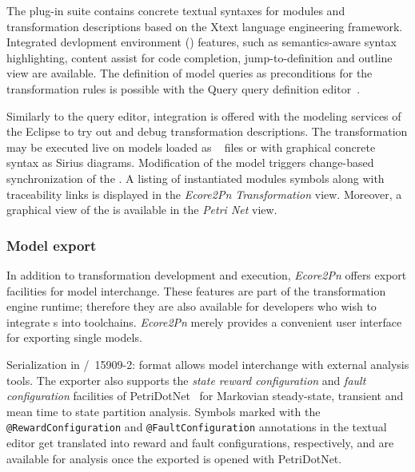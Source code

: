 The plug-in suite contains concrete textual syntaxes for  modules and transformation descriptions based on the Xtext language engineering framework. Integrated devlopment environment () features, such as semantics-aware syntax highlighting, content assist for code completion, jump-to-definition and outline view are available. The definition of model queries as preconditions for the  transformation rules is possible with the  Query  query definition editor~\citep{Ujhelyi15incquery}.

Similarly to the  query editor, integration is offered with the modeling services of the Eclipse  to try out and debug transformation descriptions. The transformation may be executed live on models loaded as ~\citep{OMG15xmi} files or with graphical concrete syntax as Sirius diagrams. Modification of the model triggers change-based synchronization of the . A listing of instantiated  modules symbols along with traceability links is displayed in the \emph{Ecore2Pn Transformation} view. Moreover, a graphical view of the  is available in the \emph{Petri Net} view.

\subsubsection{Model export}

In addition to transformation development and execution, \emph{Ecore2Pn} offers export facilities for model interchange. These features are part of the transformation engine runtime; therefore they are also available for developers who wish to integrate s into  toolchains. \emph{Ecore2Pn} merely provides a convenient user interface for exporting single models.

Serialization in /~15909-2:\citeyear{ISO1590922011}  format allows model interchange with external analysis tools. The exporter also supports the \emph{state reward configuration} and \emph{fault configuration} facilities of PetriDotNet~\citep[Section~4.2]{Voros17pdnmanual} for Markovian steady-state, transient and mean time to state partition analysis. Symbols marked with the \texttt{@Reward\-Conf{}iguration} and \texttt{@Fault\-Conf{}iguration} annotations in the  textual editor get translated into reward and fault configurations, respectively, and are available for analysis once the exported  is opened with PetriDotNet.

